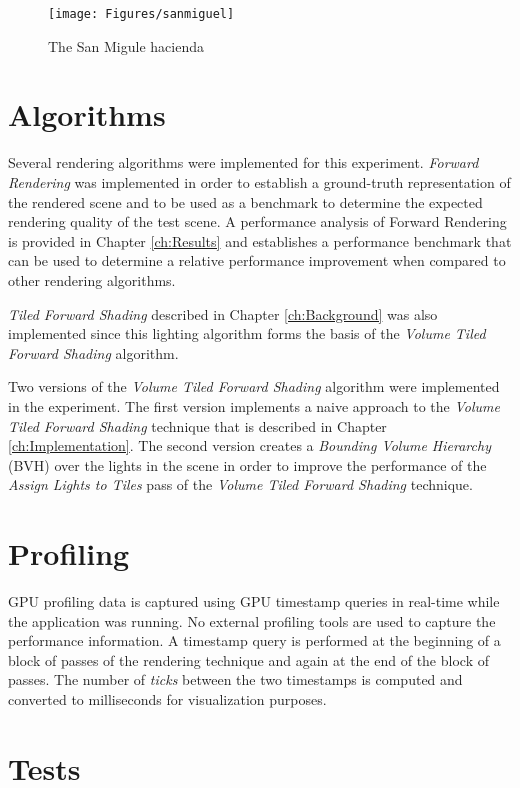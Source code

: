 \begin{figure}[H]
\centering
\texttt{[image: Figures/sanmiguel]}
\decoRule
\caption{The San Migule hacienda \parencite{McGuire2011Data}}
\label{fig:SanMiguel}
\end{figure}

\section{Algorithms}
\label{sec:Algorithms}

Several rendering algorithms were implemented for this experiment. \emph{Forward Rendering} was implemented in order to establish a ground-truth representation of the rendered scene and to be used as a benchmark to determine the expected rendering quality of the test scene. A performance analysis of Forward Rendering is provided in Chapter \ref{ch:Results} and establishes a performance benchmark that can be used to determine a relative performance improvement when compared to other rendering algorithms.

\emph{Tiled Forward Shading} described in Chapter \ref{ch:Background} was also implemented since this lighting algorithm forms the basis of the \emph{Volume Tiled Forward Shading} algorithm.

Two versions of the \emph{Volume Tiled Forward Shading} algorithm were implemented in the experiment. The first version implements a naive approach to the \emph{Volume Tiled Forward Shading} technique that is described in Chapter \ref{ch:Implementation}. The second version creates a \emph{Bounding Volume Hierarchy} (BVH) over the lights in the scene in order to improve the performance of the \emph{Assign Lights to Tiles} pass of the \emph{Volume Tiled Forward Shading} technique.

\section{Profiling}

GPU profiling data is captured using GPU timestamp queries in real-time while the application was running. No external profiling tools are used to capture the performance information. A timestamp query is performed at the beginning of a block of passes of the rendering technique and again at the end of the block of passes. The number of \emph{ticks} between the two timestamps is computed and converted to milliseconds for visualization purposes.

\section{Tests}

